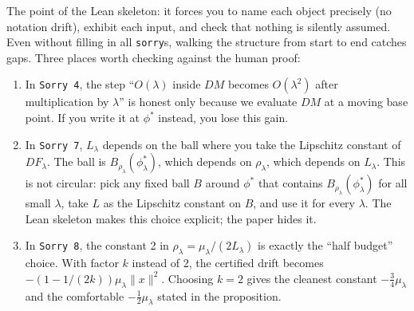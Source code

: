 \documentclass[11pt]{article}
\begin{document}
The point of the Lean skeleton: it forces you to name each object precisely (no notation drift), exhibit each input, and check that nothing is silently assumed. Even without filling in all \texttt{sorry}s, walking the structure from start to end catches gaps. Three places worth checking against the human proof:
\begin{enumerate}
\item In \texttt{Sorry 4}, the step ``$O(\lambda)$ inside $DM$ becomes $O(\lambda^2)$ after multiplication by $\lambda$'' is honest only because we evaluate $DM$ at a moving base point. If you write it at $\phi^*$ instead, you lose this gain.
\item In \texttt{Sorry 7}, $L_\lambda$ depends on the ball where you take the Lipschitz constant of $DF_\lambda$. The ball is $B_{\rho_\lambda}(\phi^*_\lambda)$, which depends on $\rho_\lambda$, which depends on $L_\lambda$. This is not circular: pick any fixed ball $B$ around $\phi^*$ that contains $B_{\rho_\lambda}(\phi^*_\lambda)$ for all small $\lambda$, take $L$ as the Lipschitz constant on $B$, and use it for every $\lambda$. The Lean skeleton makes this choice explicit; the paper hides it.
\item In \texttt{Sorry 8}, the constant 2 in $\rho_\lambda = \mu_\lambda / (2 L_\lambda)$ is exactly the ``half budget'' choice. With factor $k$ instead of 2, the certified drift becomes $-(1 - 1/(2k)) \mu_\lambda \|x\|^2$. Choosing $k = 2$ gives the cleanest constant $-\tfrac{3}{4} \mu_\lambda$ and the comfortable $-\tfrac{1}{2}\mu_\lambda$ stated in the proposition.
\end{enumerate}
\end{document}
